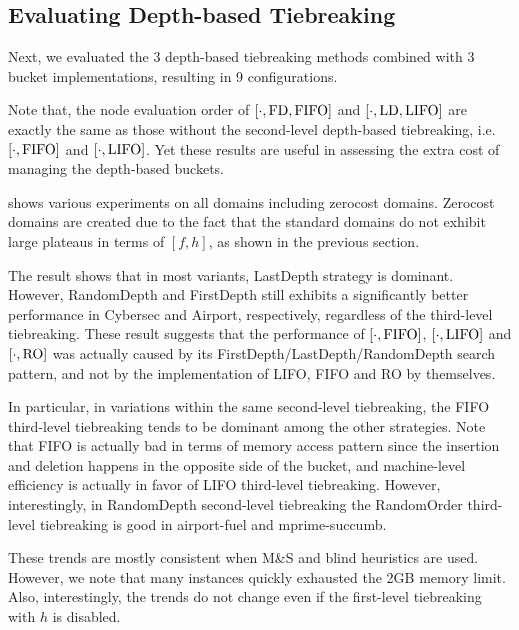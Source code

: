 

\subsection{Evaluating Depth-based Tiebreaking}

Next, we evaluated the 3 depth-based tiebreaking methods combined with 3
bucket implementations, resulting in 9 configurations.

Note that, the node evaluation order of $[\cdot,\mbox{FD},\mbox{FIFO}]$ and $[\cdot,\mbox{LD},\mbox{LIFO}]$
are exactly the same as those without the second-level
depth-based tiebreaking, i.e.\ $[\cdot,\mbox{FIFO}]$ and $[\cdot,\mbox{LIFO}]$.
Yet these results are useful in assessing the extra cost of managing the
depth-based buckets.

 shows various experiments on all domains including
zerocost domains. Zerocost domains are created due to the fact that the
standard domains do not exhibit large plateaus in terms of $[f,h]$, as
shown in the previous section.

The result shows that in most variants, LastDepth strategy is
dominant. However, RandomDepth and FirstDepth still exhibits a
significantly better performance in Cybersec and Airport, respectively,
regardless of the third-level tiebreaking.  These result suggests that
the performance of $[\cdot,\mbox{FIFO}]$, $[\cdot,\mbox{LIFO}]$ and $[\cdot,\mbox{RO}]$
was actually caused by its FirstDepth/LastDepth/RandomDepth search
pattern, and not by the implementation of LIFO, FIFO and RO
by themselves.

In particular, in variations within the same second-level tiebreaking,
the FIFO third-level tiebreaking tends to be dominant among the other
strategies. Note that FIFO is actually bad in terms of memory access
pattern since the insertion and deletion happens in the opposite side of
the bucket, and machine-level efficiency is actually in favor of LIFO
third-level tiebreaking.  However, interestingly, in RandomDepth
second-level tiebreaking the RandomOrder third-level tiebreaking is good
in airport-fuel and mprime-succumb.

These trends are mostly consistent when M\&S and blind heuristics are used.
However, we note that many instances quickly exhausted the 2GB memory limit.
Also, interestingly, the trends do not change even if the first-level tiebreaking with
$h$ is disabled.

